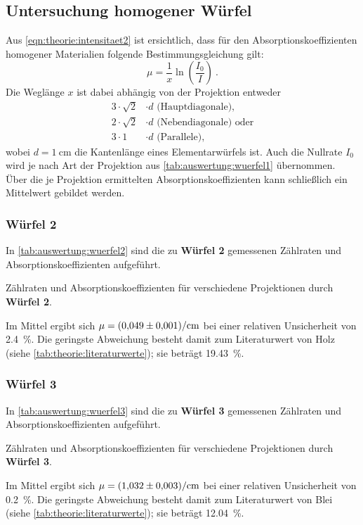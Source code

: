 \subsection{Untersuchung homogener Würfel}
Aus \autoref{eqn:theorie:intensitaet2} ist ersichtlich,
dass für den Absorptionskoeffizienten homogener Materialien folgende Bestimmungsgleichung gilt:
\begin{equation*}
    \mu = \frac{1}{x} \ln \left( \frac{I_0}{I} \right) \ .
\end{equation*}
Die Weglänge $x$ ist dabei abhängig von der Projektion entweder
\begin{align*}
    3·\sqrt{2}&·d \text{ (Hauptdiagonale),} \\
    2·\sqrt{2}&·d \text{ (Nebendiagonale) oder} \\
    3·1       &·d \text{ (Parallele),}
\end{align*}
wobei $d = \SI{1}{\centi\meter}$ die Kantenlänge eines Elementarwürfels ist.
Auch die Nullrate $I_0$ wird je nach Art der Projektion aus \autoref{tab:auswertung:wuerfel1} übernommen.
Über die je Projektion ermittelten Absorptionskoeffizienten kann schließlich ein Mittelwert gebildet werden.


\subsubsection{Würfel 2} \label{sec:auswertung:wuerfel2}
In \autoref{tab:auswertung:wuerfel2} sind die zu \textbf{Würfel 2} gemessenen Zählraten und Absorptionskoeffizienten aufgeführt.
\begin{table}[H]
    \centering
    \caption{Zählraten und Absorptionskoeffizienten für verschiedene Projektionen durch \textbf{Würfel 2}.}
    \label{tab:auswertung:wuerfel2}
\end{table}
Im Mittel ergibt sich $\mu = \SI{0.049 \pm 0.001}{\per\centi\meter}$
bei einer relativen Unsicherheit von \SI{2.4}{\percent}.
Die geringste Abweichung besteht damit zum Literaturwert von Holz (siehe \autoref{tab:theorie:literaturwerte});
sie beträgt \SI{19.43}{\percent}.


\subsubsection{Würfel 3} \label{sec:auswertung:wuerfel3}
In \autoref{tab:auswertung:wuerfel3} sind die zu \textbf{Würfel 3} gemessenen Zählraten und Absorptionskoeffizienten aufgeführt.
\begin{table}[H]
    \centering
    \caption{Zählraten und Absorptionskoeffizienten für verschiedene Projektionen durch \textbf{Würfel 3}.}
    \label{tab:auswertung:wuerfel3}
\end{table}
Im Mittel ergibt sich $\mu = \SI{1.032 \pm 0.003}{\per\centi\meter}$
bei einer relativen Unsicherheit von \SI{0.2}{\percent}.
Die geringste Abweichung besteht damit zum Literaturwert von Blei (siehe \autoref{tab:theorie:literaturwerte});
sie beträgt \SI{12.04}{\percent}.


